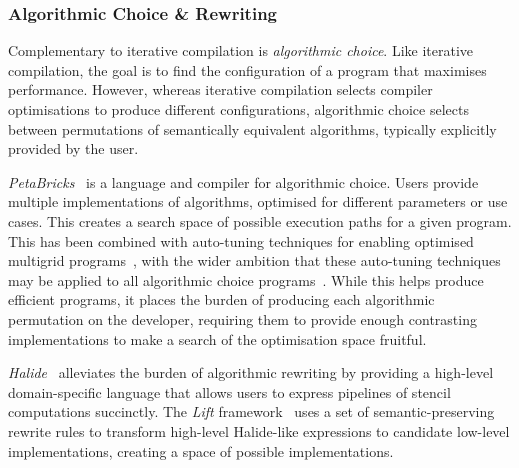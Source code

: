 \subsubsection{Algorithmic Choice \& Rewriting}

Complementary to iterative compilation is \emph{algorithmic choice}. Like iterative compilation, the goal is to find the configuration of a program that maximises performance. However, whereas iterative compilation selects compiler optimisations to produce different configurations, algorithmic choice selects between permutations of semantically equivalent algorithms, typically explicitly provided by the user.

\emph{PetaBricks}~\cite{Ansel2009a} is a language and compiler for algorithmic choice. Users provide multiple implementations of algorithms, optimised for different parameters or use cases. This creates a search space of possible execution paths for a given program. This has been combined with auto-tuning techniques for enabling optimised multigrid programs~\cite{Chan2009}, with the wider ambition that these auto-tuning techniques may be applied to all algorithmic choice programs~\cite{Ansel2014}. While this helps produce efficient programs, it places the burden of producing each algorithmic permutation on the developer, requiring them to provide enough contrasting implementations to make a search of the optimisation space fruitful.

\emph{Halide}~\cite{Ragan-Kelley2013} alleviates the burden of algorithmic rewriting by providing a high-level domain-specific language that allows users to express pipelines of stencil computations succinctly.
The \emph{Lift} framework~\cite{Steuwer2017} uses a set of semantic-preserving rewrite rules to transform high-level Halide-like expressions to candidate low-level implementations, creating a space of possible implementations.


